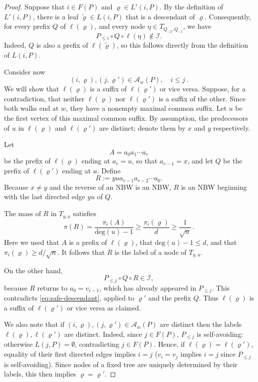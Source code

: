 \documentclass[11pt,a4paper]{article}
\theoremstyle{plain}
\def\deg{\mathrm{deg}}
\let\rho=\varrho
\begin{document}
\begin{proof}
 Suppose that
$i\in F(P)$ and $\rho\in L'(i,P)$. By the definition of
$L'(i,P)$, there is a leaf $\tilde \rho\in L(i,P)$ that is a
descendant of $\rho$. Consequently, for every prefix $Q$ of
$\ell(\rho)$, and every node
$\eta\in T_{Q_{-2},Q_{-1}}$, we have
\[
P_{\le i}\circ Q\circ\ell(\eta)\notin\mathcal I.
\tag{1}\label{eq:safe-descendant}
\]
Indeed, $Q$ is also a prefix of $\ell(\tilde\rho)$, so this follows
directly from the definition of $L(i,P)$.

Consider now
\[
(i,\rho),(j,\rho')\in\mathcal A_w(P), \quad i\leq j\, .
\]
We will show that $\ell(\rho)$ is a suffix of $\ell(\rho')$ or vice versa. 
Suppose, for a contradiction, that neither $\ell(\rho)$ nor
$\ell(\rho')$ is a suffix of the other. Since both walks end at $w$,
they have a nonempty maximal common suffix. Let $u$ be the first
vertex of this maximal common suffix. By assumption, the predecessors of $u$ in
$\ell(\rho)$ and $\ell(\rho')$ are distinct; denote them by $x$ and
$y$ respectively.

Let
\[
A=a_0a_1\cdots a_r
\]
be the prefix of $\ell(\rho)$ ending at $a_r=u$, so that
$a_{r-1}=x$, and let $Q$ be the prefix of $\ell(\rho')$ ending at
$u$. Define
\[
R:=yua_{r-1}a_{r-2}\cdots a_0.
\]
Because $x\neq y$ and the reverse of an NBW is an NBW, $R$ is an
NBW beginning with the last directed edge $yu$ of $Q$.

The mass of $R$ in $T_{y,u}$ satisfies
\[
\pi(R)
=
\frac{\pi_i(A)}{\deg(u)-1}
\ge
\frac{\pi_i(\rho)}{d}
\ge
\frac{1}{\sqrt n}\, .
\]
Here we used that $A$ is a prefix of $\ell(\rho)$, that
$\deg(u)-1\le d$, and that
$\pi_i(\rho)\ge d/\sqrt n$. It follows that $R$ is the label of
a node of $T_{y,u}$.

On the other hand,
\[
P_{\le j}\circ Q\circ R\in\mathcal I,
\]
because $R$ returns to $a_0=v_{i-1}$, which has already appeared
in $P_{\le j}$. This contradicts
\eqref{eq:safe-descendant}, applied to $\rho'$ and the prefix
$Q$. Thus $\ell(\rho)$ is a suffix of $\ell(\rho')$ or vice versa as claimed. 

We also note that if 
\(
(i,\rho),(j,\rho')\in\mathcal A_w(P)
\)
are distinct then the labels $\ell(\rho), \ell(\rho')$ are
distinct.
Indeed, since $j\in F(P)$, $P_{\le j}$ is
self-avoiding: otherwise $L(j,P)=\emptyset$, contradicting
$j\in F(P)$. Hence, if
$\ell(\rho)=\ell(\rho')$, equality of their first directed edges
implies $i=j$ ($v_i=v_j$ implies $i=j$ since $P_{\leq j}$ is self-avoiding). Since nodes of a fixed tree are uniquely determined
by their labels, this then implies $\rho=\rho'$.


\end{proof}
\end{document}
